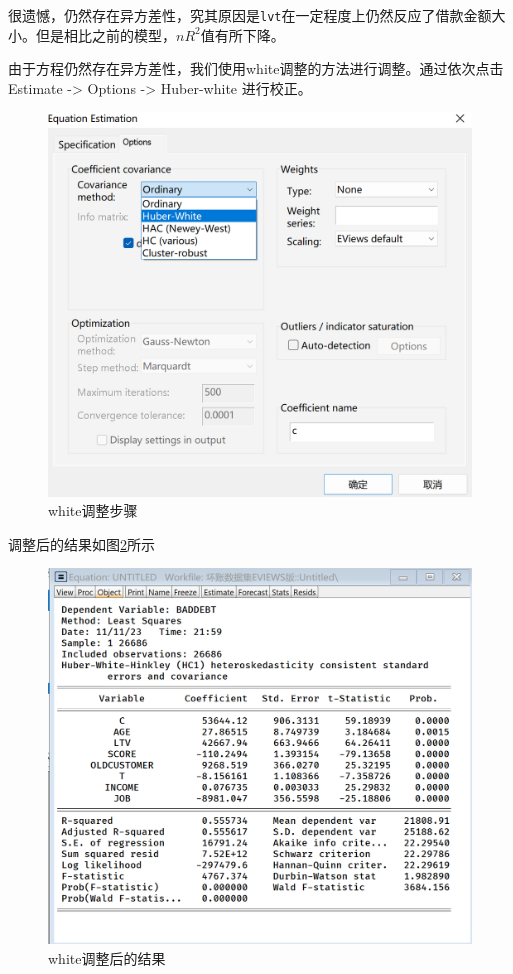 \documentclass[13.5pt,hyperref,a4paper,UTF8]{ctexart}
\begin{document}
很遗憾，仍然存在异方差性，究其原因是\texttt{lvt}在一定程度上仍然反应了借款金额大小。但是相比之前的模型，$nR^2$值有所下降。

由于方程仍然存在异方差性，我们使用white调整的方法进行调整。通过依次点击 Estimate -> Options -> Huber-white 进行校正。

\begin{figure}[H]
    \centering
    \includegraphics[width=0.5\linewidth]{figures//3回归//回归2/white调整步骤.png}
    \caption{white调整步骤}
    \label{white调整步骤}
\end{figure}

调整后的结果如图\ref{white调整后的结果}所示

\begin{figure}[H]
    \centering
    \includegraphics[width=1\linewidth]{figures//3回归//回归2/white修正后的结果.png}
    \caption{white调整后的结果}
    \label{white调整后的结果}
\end{figure}
\end{document}
